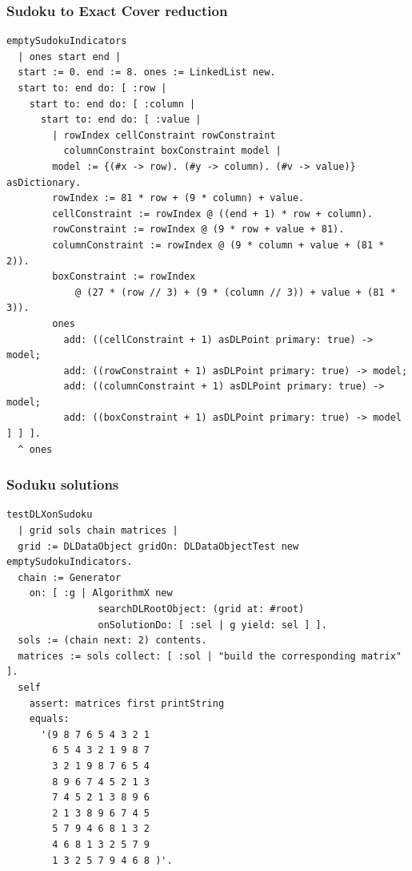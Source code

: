 \documentclass[10pt]{beamer}
\begin{document}
\begin{frame}[fragile]
\frametitle{Sudoku to Exact Cover reduction}
\begin{verbatim}
emptySudokuIndicators
  | ones start end |
  start := 0. end := 8. ones := LinkedList new.
  start to: end do: [ :row | 
    start to: end do: [ :column | 
      start to: end do: [ :value | 
        | rowIndex cellConstraint rowConstraint 
          columnConstraint boxConstraint model |
        model := {(#x -> row). (#y -> column). (#v -> value)} asDictionary.
        rowIndex := 81 * row + (9 * column) + value.
        cellConstraint := rowIndex @ ((end + 1) * row + column).
        rowConstraint := rowIndex @ (9 * row + value + 81).
        columnConstraint := rowIndex @ (9 * column + value + (81 * 2)).
        boxConstraint := rowIndex
            @ (27 * (row // 3) + (9 * (column // 3)) + value + (81 * 3)).
        ones
          add: ((cellConstraint + 1) asDLPoint primary: true) -> model;
          add: ((rowConstraint + 1) asDLPoint primary: true) -> model;
          add: ((columnConstraint + 1) asDLPoint primary: true) -> model;
          add: ((boxConstraint + 1) asDLPoint primary: true) -> model ] ] ].
  ^ ones
\end{verbatim}
\end{frame}

\begin{frame}[fragile]
\frametitle{Soduku solutions}
\begin{verbatim}
testDLXonSudoku
  | grid sols chain matrices |
  grid := DLDataObject gridOn: DLDataObjectTest new emptySudokuIndicators.
  chain := Generator
    on: [ :g | AlgorithmX new
                searchDLRootObject: (grid at: #root)
                onSolutionDo: [ :sel | g yield: sel ] ].
  sols := (chain next: 2) contents.
  matrices := sols collect: [ :sol | "build the corresponding matrix" ].
  self
    assert: matrices first printString
    equals:
      '(9 8 7 6 5 4 3 2 1
        6 5 4 3 2 1 9 8 7
        3 2 1 9 8 7 6 5 4
        8 9 6 7 4 5 2 1 3
        7 4 5 2 1 3 8 9 6
        2 1 3 8 9 6 7 4 5
        5 7 9 4 6 8 1 3 2
        4 6 8 1 3 2 5 7 9
        1 3 2 5 7 9 4 6 8 )'.
\end{verbatim}
\end{frame}
\end{document}
